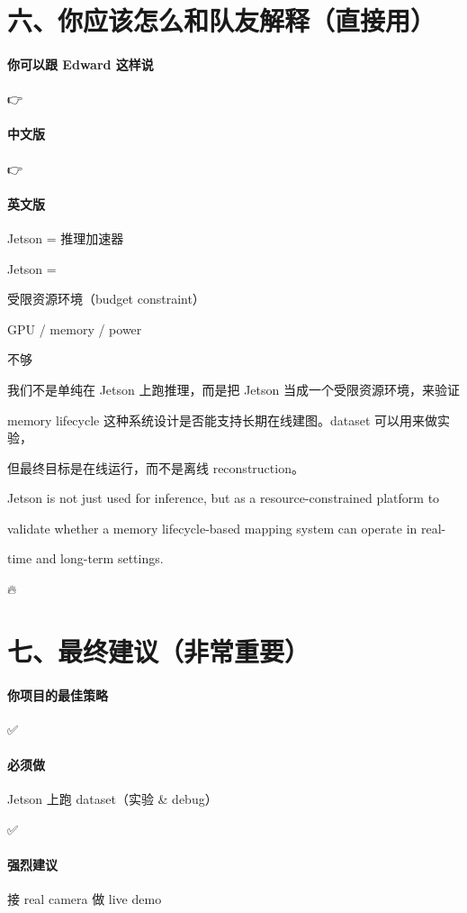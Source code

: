 \documentclass[12pt]{article}
\begin{document}
\section{六、你应该怎么和队友解释（直接用）}
\paragraph{你可以跟 Edward 这样说}
👉

\paragraph{中文版}
👉

\paragraph{英文版}
Jetson = 推理加速器

Jetson =

受限资源环境（budget constraint）

GPU / memory / power

不够

我们不是单纯在 Jetson 上跑推理，而是把 Jetson 当成一个受限资源环境，来验证

memory lifecycle 这种系统设计是否能支持长期在线建图。dataset 可以用来做实验，

但最终目标是在线运行，而不是离线 reconstruction。

Jetson is not just used for inference, but as a resource-constrained platform to

validate whether a memory lifecycle-based mapping system can operate in real-

time and long-term settings.

🔥

\section{七、最终建议（非常重要）}
\paragraph{你项目的最佳策略}
✅

\paragraph{必须做}
Jetson 上跑 dataset（实验 \& debug）

✅

\paragraph{强烈建议}
接 real camera 做 live demo
\end{document}
